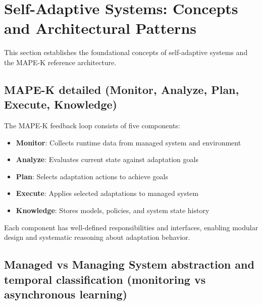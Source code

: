 \documentclass[11pt,a4paper]{article}
\begin{document}
\newpage


\setcounter{section}{0}
\renewcommand{\thesection}{2.\arabic{section}}
\renewcommand{\thesubsection}{2.\arabic{section}.\arabic{subsection}}
\renewcommand{\thesubsubsection}{2.\arabic{section}.\arabic{subsection}.\arabic{subsubsection}}

\section{Self-Adaptive Systems: Concepts and Architectural Patterns}

This section establishes the foundational concepts of self-adaptive systems and the MAPE-K reference architecture.

\subsection{MAPE-K detailed (Monitor, Analyze, Plan, Execute, Knowledge)}

The MAPE-K feedback loop consists of five components:

\begin{itemize}
    \item \textbf{Monitor}: Collects runtime data from managed system and environment
    \item \textbf{Analyze}: Evaluates current state against adaptation goals
    \item \textbf{Plan}: Selects adaptation actions to achieve goals
    \item \textbf{Execute}: Applies selected adaptations to managed system
    \item \textbf{Knowledge}: Stores models, policies, and system state history
\end{itemize}

Each component has well-defined responsibilities and interfaces, enabling modular design and systematic reasoning about adaptation behavior.

\subsection{Managed vs Managing System abstraction and temporal classification (monitoring vs asynchronous learning)}
\end{document}
